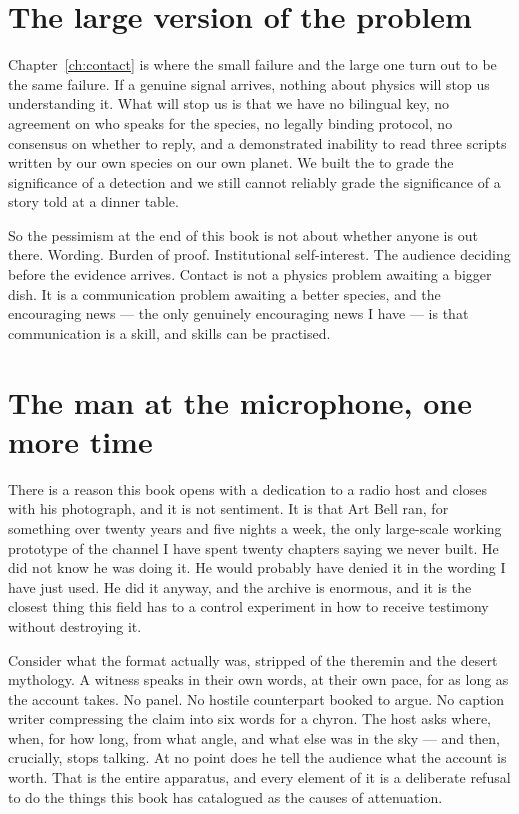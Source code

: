 \section*{The large version of the problem}

Chapter~\ref{ch:contact} is where the small failure and the large one turn out to
be the same failure. If a genuine signal arrives, nothing about physics will
stop us understanding it. What will stop us is that we have no bilingual key,
no agreement on who speaks for the species, no legally binding protocol,
no consensus on whether to reply, and a demonstrated inability to read three
scripts written by our own species on our own planet. We built the
 to grade the significance of a detection and we still cannot
reliably grade the significance of a story told at a dinner table.

So the pessimism at the end of this book is not about whether anyone is out
there.  Wording.
Burden of proof. Institutional self-interest. The audience deciding before the
evidence arrives. Contact is not a physics problem awaiting a bigger dish. It is
a communication problem awaiting a better species, and the encouraging news ---
the only genuinely encouraging news I have --- is that communication is a skill,
and skills can be practised.

\section*{The man at the microphone, one more time}

There is a reason this book opens with a dedication to a radio host and closes with
his photograph, and it is not sentiment. It is that Art Bell ran, for something
over twenty years and five nights a week, the only large-scale working prototype of
the channel I have spent twenty chapters saying we never built. He did not know he
was doing it. He would probably have denied it in the wording I have just used. He
did it anyway, and the archive is enormous, and it is the closest thing this field
has to a control experiment in how to receive testimony without destroying it.

Consider what the format actually was, stripped of the theremin and the desert
mythology. A witness speaks in their own words, at their own pace, for as long as
the account takes. No panel. No hostile counterpart booked to argue. No caption
writer compressing the claim into six words for a chyron. The host asks where, when,
for how long, from what angle, and what else was in the sky --- and then, crucially,
stops talking. At no point does he tell the audience what the account is worth.
That is the entire apparatus, and every element of it is a deliberate refusal to do
the things this book has catalogued as the causes of attenuation.

